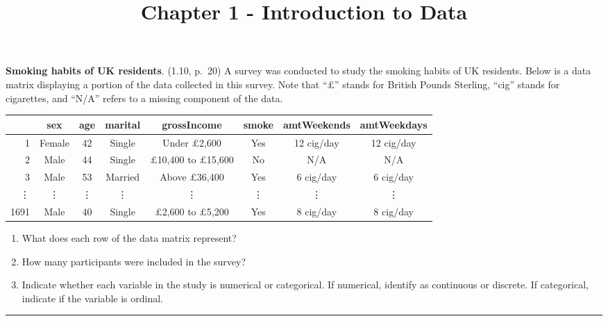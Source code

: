 \documentclass[
]{article}
\title{Chapter 1 - Introduction to Data}
\author{}
\date{\vspace{-2.5em}}
\providecommand{\tightlist}{%
  \setlength{\itemsep}{0pt}\setlength{\parskip}{0pt}}
\begin{document}
\maketitle

\textbf{Smoking habits of UK residents}. (1.10, p.~20) A survey was
conducted to study the smoking habits of UK residents. Below is a data
matrix displaying a portion of the data collected in this survey. Note
that ``\(\pounds\)'' stands for British Pounds Sterling, ``cig'' stands
for cigarettes, and ``N/A'' refers to a missing component of the data.

\begin{center}
\scriptsize{
\begin{tabular}{rccccccc}
\hline
    & sex    & age  & marital   & grossIncome                        & smoke & amtWeekends  & amtWeekdays \\ 
\hline
1   & Female & 42   & Single    & Under $\pounds$2,600               & Yes   & 12 cig/day   & 12 cig/day \\ 
2   & Male   & 44   & Single    & $\pounds$10,400 to $\pounds$15,600 & No    & N/A          & N/A \\ 
3   & Male   & 53   & Married   & Above $\pounds$36,400              & Yes   & 6 cig/day    & 6 cig/day \\ 
\vdots & \vdots & \vdots & \vdots & \vdots                           & \vdots & \vdots      & \vdots \\ 
1691 & Male  & 40   & Single    & $\pounds$2,600 to $\pounds$5,200   & Yes   & 8 cig/day    & 8 cig/day \\   
\hline
\end{tabular}
}
\end{center}

\begin{enumerate}
\def\labelenumi{(\alph{enumi})}
\tightlist
\item
  What does each row of the data matrix represent?
\item
  How many participants were included in the survey?
\item
  Indicate whether each variable in the study is numerical or
  categorical. If numerical, identify as continuous or discrete. If
  categorical, indicate if the variable is ordinal.
\end{enumerate}

\begin{center}\rule{0.5\linewidth}{0.5pt}\end{center}

\clearpage
\end{document}
